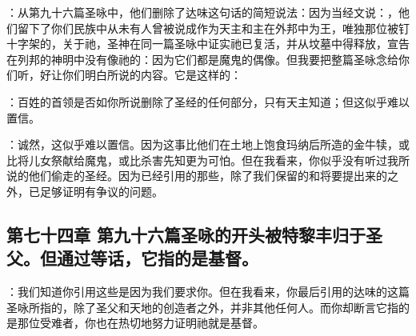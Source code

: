 ：从第九十六篇圣咏中，他们删除了达味这句话的简短说法：因为当经文说：，他们留下了你们民族中从未有人曾被说成作为天主和主在外邦中为王，唯独那位被钉十字架的，关于祂，圣神在同一篇圣咏中证实祂已复活，并从坟墓中得释放，宣告在列邦的神明中没有像祂的：因为它们都是魔鬼的偶像。但我要把整篇圣咏念给你们听，好让你们明白所说的内容。它是这样的：\par

：百姓的首领是否如你所说删除了圣经的任何部分，只有天主知道；但这似乎难以置信。\par

：诚然，这似乎难以置信。因为这事比他们在土地上饱食玛纳后所造的金牛犊，或比将儿女祭献给魔鬼，或比杀害先知更为可怕。但在我看来，你似乎没有听过我所说的他们偷走的圣经。因为已经引用的那些，除了我们保留的和将要提出来的之外，已足够证明有争议的问题。\par


\subsection{第七十四章 第九十六篇圣咏的开头被特黎丰归于圣父。但通过等话，它指的是基督。}

：我们知道你引用这些是因为我们要求你。但在我看来，你最后引用的达味的这篇圣咏所指的，除了圣父和天地的创造者之外，并非其他任何人。而你却断言它指的是那位受难者，你也在热切地努力证明祂就是基督。\par

